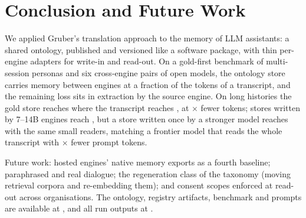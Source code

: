 \section{Conclusion and Future Work}\label{sec:conclusion}

We applied Gruber's translation approach to the memory of LLM assistants: a shared ontology,
published and versioned like a software package, with thin per-engine adapters for write-in and
read-out. On a gold-first benchmark of multi-session personas and six cross-engine pairs of open
models, the ontology store carries memory between engines at a fraction of the tokens of a
transcript, and the remaining loss sits in extraction by the source engine. On long histories
the gold store reaches \PFM {} where the transcript reaches
, at $\times$ fewer tokens; stores written by
7--14B engines reach , but a store written once by a stronger model reaches
 with the same small readers, matching a frontier model that reads the
whole transcript with $\times$ fewer prompt tokens.

Future work: hosted engines' native memory exports as a fourth baseline; paraphrased and real dialogue; the regeneration
class of the taxonomy (moving retrieval corpora and re-embedding them); and consent scopes enforced
at read-out across organisations. The ontology, registry artifacts, benchmark and prompts are
available at \repo, and all run outputs at \runsdoi.
